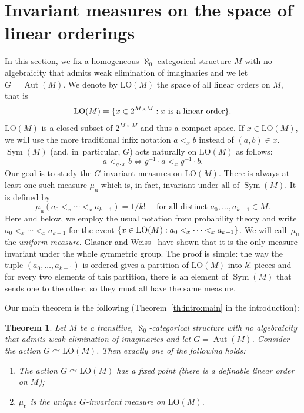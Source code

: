 \documentclass[JEP,XML,SOM,Unicode,published]{cedram}
\let\actson\curvearrowright
\theoremstyle{plain}
\newtheorem{theorem}{Theorem}[section]
\theoremstyle{definition}
\DeclareMathOperator{\Aut}{Aut}
\DeclareMathOperator{\Sym}{Sym}
\DeclarePairedDelimiter\set{\{}{\}}
\newcommand{\LO}{\mathrm{LO}}
\newcommand{\muu}{\mu_{\mathrm{u}}}
\begin{document}

\section{Invariant measures on the space of linear orderings}
\label{sec:invar-meas-space}

In this section, we fix a homogeneous $\aleph_0$-categorical structure $M$ with no algebraicity that admits weak elimination of imaginaries and we let $G = \Aut(M)$. We denote by $\LO(M)$ the space of all linear orders on $M$, that is
\begin{equation*}
\LO(M) = \set{x \in 2^{M \times M} : x \text{ is a linear order}}.
\end{equation*}
$\LO(M)$ is a closed subset of $2^{M \times M}$ and thus a compact space. If $x \in \LO(M)$, we will use the more traditional infix notation $a <_x b$ instead of $(a, b) \in x$. $\Sym(M)$ (and, in~particular, $G$) acts naturally on $\LO(M)$ as follows:
\begin{equation*}
a <_{g \cdot x} b \iff g^{-1} \cdot a <_x g^{-1} \cdot b.
\end{equation*}
Our goal is to study the $G$-invariant measures on $\LO(M)$. There is always at least one such measure $\muu$ which is, in fact, invariant under all of $\Sym(M)$. It is defined by
\begin{equation*}
\muu(a_0 <_x \cdots <_x a_{k-1}) = 1/k! \quad \text{ for all distinct } a_0, \ldots, a_{k-1} \in M.
\end{equation*}
Here and below, we employ the usual notation from probability theory and write $a_0 <_x \cdots <_x a_{k-1}$ for the event $\set{x \in \LO(M) : a_0 <_x \cdots <_x a_{k-1}}$. We will call~$\muu$ the \emph{uniform measure}. Glasner and Weiss~\cite{Glasner2002a} have shown that it is the only measure invariant under the whole symmetric group. The proof is simple: the way the tuple $(a_0, \ldots, a_{k-1})$ is ordered gives a partition of $\LO(M)$ into $k!$ pieces and for every two elements of this partition, there is an element of $\Sym(M)$ that sends one to the other, so they must all have the same measure.

Our main theorem is the following (\cf Theorem~\ref{th:intro:main} in the introduction):
\begin{theorem}
\label{Thm:Princip} Let $M$ be a transitive, $\aleph_0$-categorical structure with no algebraicity that admits weak elimination of imaginaries and let $G=\Aut(M)$. Consider the action $G \actson \LO(M)$. Then exactly one of the following holds:
\begin{enumerate}
\item The action $G \actson \LO(M)$ has a fixed point (\ie there is a definable linear order on $M$);
\item $\muu$ is the unique $G$-invariant measure on $\LO(M)$.
\end{enumerate}
\end{theorem}
\end{document}

